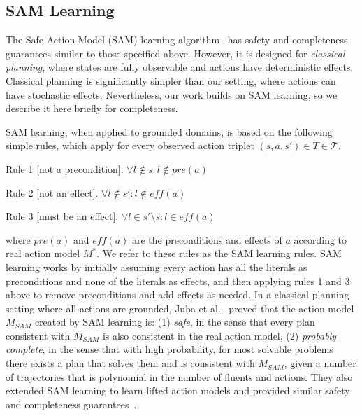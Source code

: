 \documentclass[letterpaper]{article} %
\newcommand{\eff}{\textit{eff}}
\newcommand{\pre}{\textit{pre}}
\newcommand{\sam}{\textit{SAM}}
\begin{document}






\subsection{SAM Learning}

The Safe Action Model (SAM) learning algorithm~\cite{juba2021kr,stern2017efficientAndSafe} has safety and completeness guarantees similar to those specified above. 
However, it is designed for \emph{classical planning}, where states are fully observable and actions have deterministic effects. 
Classical planning is significantly simpler than our setting, where actions can have stochastic effects, 
Nevertheless, our work builds on SAM learning, so we describe it here briefly for completeness. 


SAM learning, when applied to grounded domains, is based on the following simple rules, which apply for every observed action triplet $(s,a,s')\in T\in \mathcal{T}$.
\begin{compactenum}
    \item Rule 1 [not a precondition].  $\forall l \notin s: l \notin \pre(a)$
    \item Rule 2 [not an effect].  $\forall l \notin s': l \notin \eff(a)$
    \item Rule 3 [must be an effect].  $\forall l \in s'\setminus s: l \in \eff(a)$
\end{compactenum}
where $\pre(a)$ and $\eff(a)$ are the preconditions and effects of $a$ according to real action model $M^*$. 
We refer to these rules as the SAM learning rules. 
SAM learning works by initially assuming every action has all the literals as preconditions and none of the literals as effects, and then applying rules 1 and 3 above to remove preconditions and add effects as needed. 
In a classical planning setting where all actions are grounded, Juba et al.~ proved that the action model $M_{\sam}$ created by SAM learning is: (1) \emph{safe}, in the sense that every plan consistent with $M_{\sam}$ is also consistent in the real action model, (2) \emph{probably complete}, in the sense that with high probability, 
for most solvable problems there exists a plan that solves them and is consistent with $M_{\sam}$, given a number of trajectories that is polynomial in the number of fluents and actions. 
They also extended SAM learning to learn lifted action models and provided similar safety and completeness guarantees~\cite{juba2021kr}. 
\end{document}
